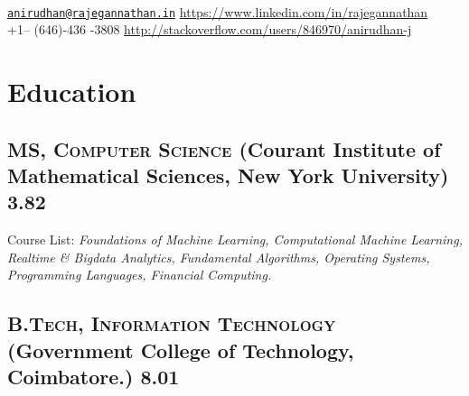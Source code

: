 \documentclass{resume}
\begin{document}
\\
{\href{mailto:anirudhan@rajegannathan.in}{\nolinkurl{anirudhan@rajegannathan.in}} \hfill \url{https://www.linkedin.com/in/rajegannathan}}\\
{+1-- (646)-436 -3808 \hfill \url{http://stackoverflow.com/users/846970/anirudhan-j}}

\section{Education}
\subsection[MS, Computer Science]{\textsc{MS, Computer Science}    \small{(Courant Institute of Mathematical Sciences, New York University)} \hfill \textbf{3.82}}%
  \begin{description}
    \item{Course List:} \small{\textit{Foundations of Machine Learning, Computational Machine Learning, Realtime \& Bigdata Analytics, Fundamental Algorithms, Operating Systems, Programming Languages, Financial Computing.}}
  \end{description}
\subsection[B.Tech, Information Technology]{\textsc{B.Tech, Information Technology}    \small{(Government College of Technology, Coimbatore.)} \hfill 8.01}%
\end{document}

